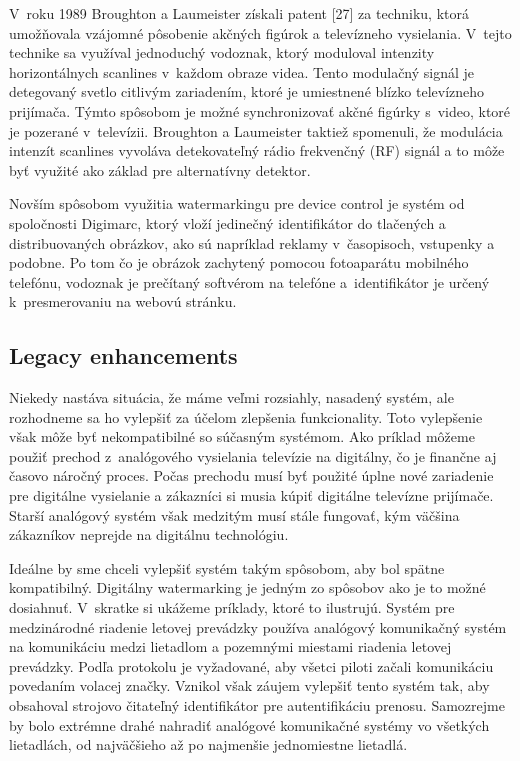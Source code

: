 V~roku 1989 Broughton a Laumeister získali patent [27] za techniku, ktorá umožňovala vzájomné pôsobenie akčných figúrok a televízneho vysielania. V~tejto technike sa využíval jednoduchý vodoznak, ktorý moduloval intenzity horizontálnych scanlines v~každom obraze videa. Tento modulačný signál je detegovaný svetlo citlivým zariadením, ktoré je umiestnené blízko televízneho prijímača. Týmto spôsobom je možné synchronizovať akčné figúrky s~video, ktoré je pozerané v~televízii. Broughton a Laumeister taktiež spomenuli, že modulácia intenzít scanlines vyvoláva detekovateľný rádio frekvenčný (RF) signál a to môže byť využité ako základ pre alternatívny detektor.

Novším spôsobom využitia watermarkingu pre device control je systém od spoločnosti Digimarc, ktorý vloží jedinečný identifikátor do tlačených a distribuovaných obrázkov, ako sú napríklad reklamy v~časopisoch, vstupenky a podobne. Po tom čo je obrázok zachytený pomocou fotoaparátu mobilného telefónu, vodoznak je prečítaný softvérom na telefóne a~identifikátor je určený k~presmerovaniu na webovú stránku. \cite{Cox}

\subsection{Legacy enhancements}
Niekedy nastáva situácia, že máme veľmi rozsiahly, nasadený systém, ale rozhodneme sa ho vylepšiť za účelom zlepšenia funkcionality. Toto vylepšenie však môže byť nekompatibilné so súčasným systémom. Ako príklad môžeme použiť prechod z~analógového vysielania televízie na digitálny, čo je finančne aj časovo náročný proces. Počas prechodu musí byť použité úplne nové zariadenie pre digitálne vysielanie a zákazníci si musia kúpiť digitálne televízne prijímače. Starší analógový systém však medzitým musí stále fungovať, kým väčšina zákazníkov neprejde na digitálnu technológiu.

Ideálne by sme chceli vylepšiť systém takým spôsobom, aby bol spätne kompatibilný. Digitálny watermarking je jedným zo spôsobov ako je to možné dosiahnuť. V~skratke si ukážeme príklady, ktoré to ilustrujú.
Systém pre medzinárodné riadenie letovej prevádzky používa analógový komunikačný systém na komunikáciu medzi lietadlom a pozemnými miestami riadenia letovej prevádzky. Podľa protokolu je vyžadované, aby všetci piloti začali komunikáciu povedaním volacej značky. Vznikol však záujem vylepšiť tento systém tak, aby obsahoval strojovo čitateľný identifikátor pre autentifikáciu prenosu. Samozrejme by bolo extrémne drahé nahradiť analógové komunikačné systémy vo všetkých lietadlách, od najväčšieho až po najmenšie jednomiestne lietadlá.

